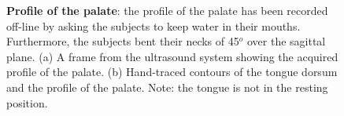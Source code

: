 \begin{figure}
  \centering
	\hspace{0.05\textwidth}

	\caption[Profile of the palate]
	{\textbf{Profile of the palate}: the profile of the palate has been recorded
	off-line by asking the subjects to keep water in their mouths.
	Furthermore, the subjects bent their necks of 45$^o$ over the sagittal
	plane.
	(a) A frame from the ultrasound system showing the acquired profile of the
	palate. (b) Hand-traced contours of the tongue dorsum and the 
	profile of the palate. Note: the tongue is not in the resting position.}
	\label{fig:results:pal}
\end{figure}

